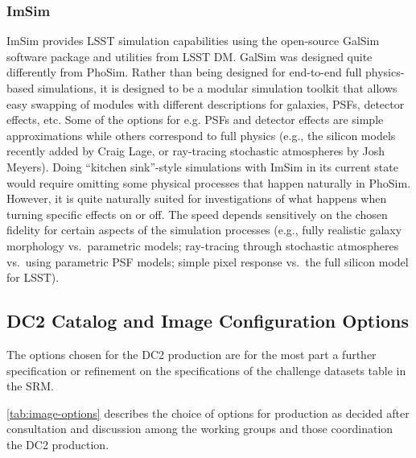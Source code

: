 \documentclass[preprint,times]{aastex61}
\begin{document}
\subsubsection{ImSim}

ImSim provides LSST simulation capabilities using the open-source GalSim software package and utilities from LSST DM.  GalSim was designed quite differently from PhoSim.  Rather than being designed for end-to-end full physics-based simulations, it is designed to be a modular simulation toolkit that allows easy swapping of modules with different descriptions for galaxies, PSFs, detector effects, etc.  Some of the options for e.g. PSFs and detector effects are simple approximations while others correspond to full physics (e.g., the silicon models recently added by Craig Lage, or ray-tracing stochastic atmospheres by Josh Meyers).  Doing ``kitchen sink''-style simulations with ImSim in its current state would require omitting some physical processes that happen naturally in PhoSim.  However, it is quite naturally suited for investigations of what happens when turning specific effects on or off.  The speed depends sensitively on the chosen fidelity for certain aspects of the simulation processes (e.g., fully realistic galaxy morphology vs.\ parametric models; ray-tracing through stochastic atmospheres vs.\ using parametric PSF models; simple pixel response vs.\ the full silicon model for LSST).


\subsection{DC2 Catalog and Image Configuration Options}

The options chosen for the DC2 production are for the most part a
further specification or refinement on the specifications of the challenge datasets
table in the SRM. 

\autoref{tab:image-options} describes the choice of options for
production as decided after consultation and discussion among the
working groups and those coordination the DC2 production.
\end{document}
